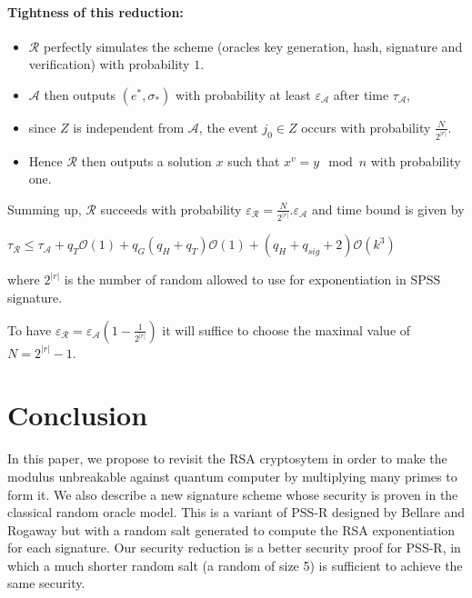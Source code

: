 \documentclass[a4paper,11pt]{article}
\begin{document}
\paragraph{Tightness of this reduction:}
\begin{itemize}
 \item  $\mathcal{R}$ perfectly simulates the scheme (oracles key generation,  hash, signature and verification) with probability $1$.
 \item $\mathcal{A}$ then outputs  $(e^{*}, \sigma_{*}) $ with probability at least  $\varepsilon_{\mathcal{A}}$
after time $\tau_{\mathcal{A}}$,
 \item  since $Z$ is independent from $\mathcal{A}$, the event $j_{0} \in Z $ occurs with probability $\frac{N}{2^{|r|}}$.
\item Hence $\mathcal{R}$ then outputs a solution $x$ such that $x^{v} = y \mod n$ with probability one.
 \end{itemize}
Summing up, $\mathcal{R}$ succeeds with probability $\varepsilon_{\mathcal{R}} = \frac{N}{2^{|r|}}.\varepsilon_{\mathcal{A}} $
  and time bound is given by

  \vspace{0.2cm}

   $\tau_{\mathcal{R}}\leq \tau_{\mathcal{A}} + q_{T}\mathcal{O}(1) + q_{G}(q_{H}+q_{T})\mathcal{O}(1)+ (q_{H}+q_{sig}+2)\mathcal{O}(k^{3})$

   \vspace{0.2cm}

 where $2^{|r|}$ is the number of random allowed to use for exponentiation in SPSS signature.

To have $\varepsilon_{\mathcal{R}} = \varepsilon_{\mathcal{A}}(1-\frac{1}{2^{|r|}}) $ it will suffice to choose the maximal value of $N=2^{|r|}-1$.
\section{Conclusion}
In this paper, we propose to revisit the RSA cryptosytem in order to make the modulus unbreakable against quantum computer by multiplying many primes to form it. We also describe a new signature scheme whose security is proven in the classical random oracle model. This is a variant of PSS-R designed by Bellare and Rogaway but with a random salt generated to compute the RSA exponentiation for each signature. Our security reduction is a better security proof for PSS-R, in which a much shorter random salt (a random of size 5) is sufficient to achieve the same security.
\end{document}
